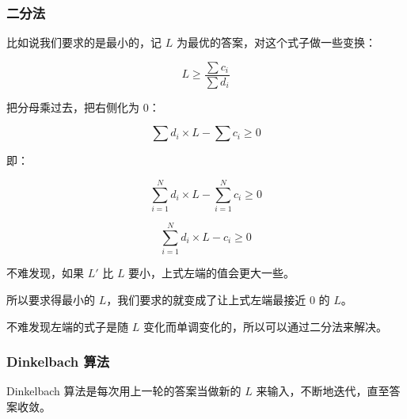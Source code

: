 \subsubsection{二分法}

比如说我们要求的是最小的，记 $L$ 为最优的答案，对这个式子做一些变换：

$$
L \geq \frac{\sum{c_i}}{\sum{d_i}}
$$

把分母乘过去，把右侧化为 $0$：

$$
{\sum{d_i}} \times L - {\sum{c_i}} \geq 0
$$

即：

$$
{\sum_{i=1}^N{d_i}} \times L - {\sum_{i=1}^N{c_i}} \geq 0
$$

$$
\sum_{i=1}^N{d_i \times L - c_i} \geq 0
$$

不难发现，如果 $L'$ 比 $L$ 要小，上式左端的值会更大一些。

所以要求得最小的 $L$，我们要求的就变成了让上式左端最接近 $0$ 的 $L$。

不难发现左端的式子是随 $L$ 变化而单调变化的，所以可以通过二分法来解决。

\subsubsection{Dinkelbach 算法}

Dinkelbach 算法是每次用上一轮的答案当做新的 $L$ 来输入，不断地迭代，直至答案收敛。
